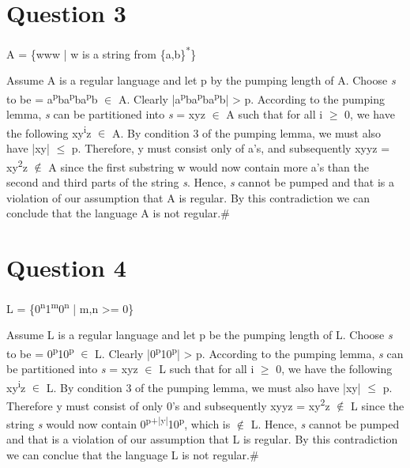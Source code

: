 \documentclass[letterpaper, 12pt]{article}
\begin{document}
\section{Question 3}
\label{sec:org7b00a5f}
A = \{www | w is a string from \{a,b\}\textsuperscript{*}\}

Assume A is a regular language and let p by the pumping length of A. Choose \emph{s} to be = a\textsuperscript{p}ba\textsuperscript{p}ba\textsuperscript{p}b \(\in\) A. Clearly |a\textsuperscript{p}ba\textsuperscript{p}ba\textsuperscript{p}b| \textgreater{} p. According to the pumping lemma, \emph{s} can be partitioned into \emph{s} = xyz \(\in\) A such that for all i \(\ge\) 0, we have the following xy\textsuperscript{i}z \(\in\) A. By condition 3 of the pumping lemma, we must also have |xy| \(\le\) p. Therefore, y must consist only of a's, and subsequently xyyz = xy\textsuperscript{2}z \(\notin\) A since the first substring w would now contain more a's than the second and third parts of the string \emph{s}. Hence, \emph{s} cannot be pumped and that is a violation of our assumption that A is regular. By this contradiction we can conclude that the language A is not regular.\#
\section{Question 4}
\label{sec:org506170d}
L = \{0\textsuperscript{n}1\textsuperscript{m}0\textsuperscript{n} | m,n >= 0\}

Assume L is a regular language and let p be the pumping length of L. Choose \emph{s} to be = 0\textsuperscript{p}10\textsuperscript{p} \(\in\) L. Clearly |0\textsuperscript{p}10\textsuperscript{p}| \textgreater{} p. According to the pumping lemma, \emph{s} can be partitioned into \emph{s} = xyz \(\in\) L such that for all i \(\ge\) 0, we have the following xy\textsuperscript{i}z \(\in\) L. By condition 3 of the pumping lemma, we must also have |xy| \(\le\) p. Therefore y must consist of only 0's and subsequently xyyz = xy\textsuperscript{2}z \(\notin\) L since the string \emph{s} would now contain 0\textsuperscript{p+|y|}10\textsuperscript{p}, which is \(\notin\) L. Hence, \emph{s} cannot be pumped and that is a violation of our assumption that L is regular. By this contradiction we can conclue that the language L is not regular.\#
\end{document}
